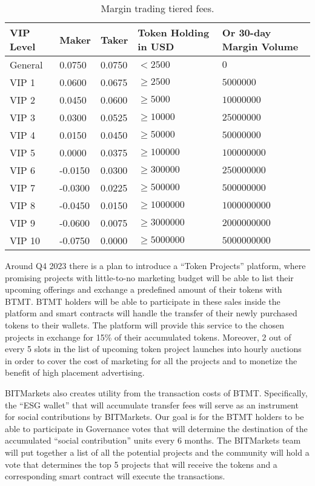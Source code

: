 \documentclass[a4paper,12pt]{article}
\begin{document}
\begin{center}
\begin{table}
\begin{tabular}{ |p{2.3cm}||p{2.3cm}|p{2.3cm}|p{2.3cm}|p{2.3cm}| }
\hline
VIP Level & Maker & Taker & Token Holding in USD & Or 30-day Margin Volume \\
\hline
General & 0.0750 & 0.0750 & $< 2500$ & $0$ \\
VIP 1 & 0.0600 & 0.0675 & $\geq 2500$ & $5000000$ \\
VIP 2 & 0.0450 & 0.0600 & $\geq 5000$ & $10000000$ \\
VIP 3 & 0.0300 & 0.0525 & $\geq 10000$ & $25000000$ \\
VIP 4 & 0.0150 & 0.0450 & $\geq 50000$ & $50000000$ \\
VIP 5 & 0.0000 & 0.0375 & $\geq 100000$ & $100000000$ \\
VIP 6 & -0.0150 & 0.0300 & $\geq 300000$ & $250000000$ \\
VIP 7 & -0.0300 & 0.0225 & $\geq 500000$ & $500000000$ \\
VIP 8 & -0.0450 & 0.0150 & $\geq 1000000$ & $1000000000$ \\
VIP 9 & -0.0600 & 0.0075 & $\geq 3000000$ & $2000000000$ \\
VIP 10 & -0.0750 & 0.0000 & $\geq 5000000$ & $5000000000$ \\
\hline
\end{tabular}
  \caption{Margin trading tiered fees.}
\end{table}
\end{center}

Around Q4 2023 there is a plan to introduce a ``Token Projects''
platform, where promising projects with little-to-no marketing budget will be able to list
their upcoming offerings and exchange a predefined amount of their tokens with BTMT.
BTMT holders will be able to participate in these sales inside the platform and smart
contracts will handle the transfer of their newly purchased tokens to their wallets.
The platform will provide this service to the chosen projects in exchange for 15\% of their
accumulated tokens.
Moreover, 2 out of every 5 slots in the list of upcoming token project launches into hourly auctions
in order to cover the cost of marketing for all the projects and to monetize the benefit
of high placement advertising.

BITMarkets also creates utility from the transaction costs of BTMT. Specifically,
the ``ESG wallet'' that will accumulate transfer fees will serve as an instrument for social contributions by BITMarkets.
Our goal is for the BTMT holders to be able to participate in Governance votes that
will determine the destination of the accumulated ``social contribution'' units every 6 months.
The BITMarkets team will put together a list of all the potential projects and
the community will hold a vote that determines the top 5
projects that will receive the tokens and a corresponding smart contract will execute the
transactions.
\end{document}
